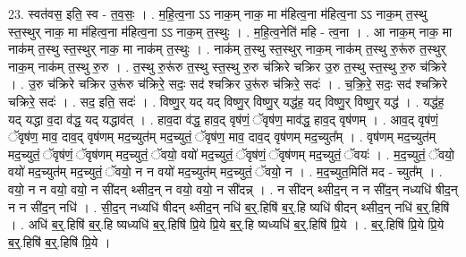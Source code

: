 \documentclass[17pt]{extarticle}
\begin{document}
23. स्वत॑वस॒ इति॒ स्व - त॒व॒सः॒ । . म॒हि॒त्व॒ना ऽऽ नाक॒म् नाक॒ मा म॑हित्व॒ना म॑हित्व॒ना ऽऽ नाक॒म् त॒स्थु स्त॒स्थुर् नाक॒ मा म॑हित्व॒ना म॑हित्व॒ना ऽऽ नाक॒म् त॒स्थुः । . म॒हि॒त्व॒नेति॑ महि - त्व॒ना । . आ नाक॒म् नाक॒ मा नाक॑म् त॒स्थु स्त॒स्थुर् नाक॒ मा नाक॑म् त॒स्थुः । . नाक॑म् त॒स्थु स्त॒स्थुर् नाक॒म् नाक॑म् त॒स्थु रु॒रू॑रु त॒स्थुर् नाक॒म् नाक॑म् त॒स्थु रु॒रु । . त॒स्थु रु॒रू॑रु त॒स्थु स्त॒स्थु रु॒रु च॑क्रिरे चक्रिर उ॒रु त॒स्थु स्त॒स्थु रु॒रु च॑क्रिरे । . उ॒रु च॑क्रिरे चक्रिर उ॒रू॑रु च॑क्रिरे॒ सदः॒ सद॑ श्चक्रिर उ॒रू॑रु च॑क्रिरे॒ सदः॑ । . च॒क्रि॒रे॒ सदः॒ सद॑ श्चक्रिरे चक्रिरे॒ सदः॑ । . सद॒ इति॒ सदः॑ । . विष्णु॒र् यद् यद् विष्णु॒र् विष्णु॒र् यद्ध॑ह॒ यद् विष्णु॒र् विष्णु॒र् यद्ध॑ । . यद्ध॑ह॒ यद् यद्धा व॒दा व॑द्ध॒ यद् यद्धाव॑त् । . हाव॒दा व॑द्ध॒ हाव॒द् वृष॑णं॒ ॅवृष॑ण॒ माव॑द्ध॒ हाव॒द् वृष॑णम् । . आव॒द् वृष॑णं॒ ॅवृष॑ण॒ माव॒ दाव॒द् वृष॑णम् मद॒च्युत॑म् मद॒च्युतं॒ ॅवृष॑ण॒ माव॒ दाव॒द् वृष॑णम् मद॒च्युत᳚म् । . वृष॑णम् मद॒च्युत॑म् मद॒च्युतं॒ ॅवृष॑णं॒ ॅवृष॑णम् मद॒च्युतं॒ ॅवयो॒ वयो॑ मद॒च्युतं॒ ॅवृष॑णं॒ ॅवृष॑णम् मद॒च्युतं॒ ॅवयः॑ । . म॒द॒च्युतं॒ ॅवयो॒ वयो॑ मद॒च्युत॑म् मद॒च्युतं॒ ॅवयो॒ न न वयो॑ मद॒च्युत॑म् मद॒च्युतं॒ ॅवयो॒ न । . म॒द॒च्युत॒मिति॑ मद - च्युत᳚म् । . वयो॒ न न वयो॒ वयो॒ न सी॑दन् थ्सीद॒न् न वयो॒ वयो॒ न सी॑दन्न् । . न सी॑दन् थ्सीद॒न् न न सी॑द॒न् नध्यधि॑ षीद॒न् न न सी॑द॒न् नधि॑ । . सी॒द॒न् नध्यधि॑ षीदन् थ्सीद॒न् नधि॑ ब॒र्॒.हिषि॑ ब॒र्॒.हि ष्यधि॑ षीदन् थ्सीद॒न् नधि॑ ब॒र्॒.हिषि॑ । . अधि॑ ब॒र्॒.हिषि॑ ब॒र्॒.हि ष्यध्यधि॑ ब॒र्॒.हिषि॑ प्रि॒ये प्रि॒ये ब॒र्॒.हि ष्यध्यधि॑ ब॒र्॒.हिषि॑ प्रि॒ये । . ब॒र्॒.हिषि॑ प्रि॒ये प्रि॒ये ब॒र्॒.हिषि॑ ब॒र्॒.हिषि॑ प्रि॒ये । \newline
\end{document}
